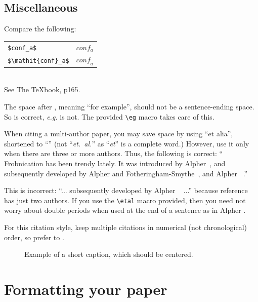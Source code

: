 \documentclass[10pt,twocolumn,letterpaper]{article}
\begin{document}
\subsection{Miscellaneous}

\noindent
Compare the following:\\
\begin{tabular}{ll}
 \verb'$conf_a$' &  $conf_a$ \\
 \verb'$\mathit{conf}_a$' & $\mathit{conf}_a$
\end{tabular}\\
See The \TeX book, p165.

The space after \eg, meaning ``for example'', should not be a
sentence-ending space. So \eg is correct, {\em e.g.} is not.  The provided
\verb'\eg' macro takes care of this.

When citing a multi-author paper, you may save space by using ``et alia'',
shortened to ``\etal'' (not ``{\em et.\ al.}'' as ``{\em et}'' is a complete word.)
However, use it only when there are three or more authors.  Thus, the
following is correct: ``
   Frobnication has been trendy lately.
   It was introduced by Alpher~\cite{Alpher02}, and subsequently developed by
   Alpher and Fotheringham-Smythe~\cite{Alpher03}, and Alpher \etal~\cite{Alpher04}.''

This is incorrect: ``... subsequently developed by Alpher \etal~\cite{Alpher03} ...''
because reference~\cite{Alpher03} has just two authors.  If you use the
\verb'\etal' macro provided, then you need not worry about double periods
when used at the end of a sentence as in Alpher \etal.

For this citation style, keep multiple citations in numerical (not
chronological) order, so prefer \cite{Alpher03,Alpher02,Authors12} to
\cite{Alpher02,Alpher03,Authors12}.


\begin{figure}
\begin{center}
\fbox{\rule{0pt}{2in} \rule{.9\linewidth}{0pt}}
\end{center}
   \caption{Example of a short caption, which should be centered.}
\label{fig:short}
\end{figure}

\section{Formatting your paper}
\end{document}
